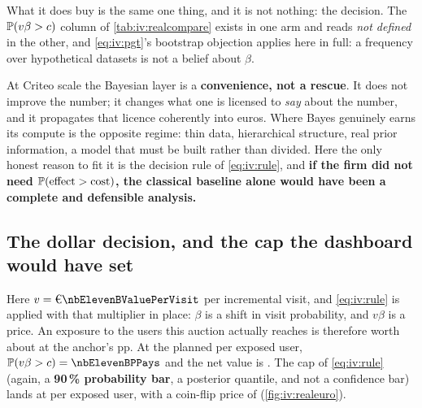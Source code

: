 What it does buy is the same one thing, and it is not nothing: the decision. The
$\operatorname{\mathbb{P}}(v\beta > c)$ column of \cref{tab:iv:realcompare} exists in one arm and reads \emph{not
defined} in the other, and \cref{eq:iv:pgt}'s bootstrap objection applies here in full: a
frequency over hypothetical datasets is not a belief about $\beta$.

\begin{remark}
At Criteo scale the Bayesian layer is a \textbf{convenience, not a rescue}. It does not improve the
number; it changes what one is licensed to \emph{say} about the number, and it propagates that
licence coherently into euros. Where Bayes genuinely earns its compute is the opposite regime:
thin data, hierarchical structure, real prior information, a model that must be built rather than
divided. Here the only honest reason to fit it is the decision rule of \cref{eq:iv:rule}, and
\textbf{if the firm did not need $\operatorname{\mathbb{P}}(\text{effect} > \text{cost})$, the classical baseline alone
would have been a complete and defensible analysis.}
\end{remark}

\subsection*{The dollar decision, and the cap the dashboard would have set}

Here $v = \eur{\nbElevenBValuePerVisit}$ per incremental visit, and \cref{eq:iv:rule} is applied with
that multiplier in place: $\beta$ is a shift in visit probability, and $v\beta$ is a price. An
exposure to the users this auction actually reaches is therefore worth about
\eur{\nbElevenBAnchorCap} at the anchor's \nbElevenBAnchorWald{} pp. At the planned
\eur{\nbElevenBCost} per exposed user, $\Prob(v\beta > c) = \nbElevenBPPays$ and the net value is
\eur{\nbElevenBNet}. The cap of \cref{eq:iv:rule} (again, a \textbf{90\,\% probability bar}, a
posterior quantile, and not a confidence bar) lands at \eur{\nbElevenBCap} per exposed user, with
a coin-flip price of \eur{\nbElevenBCoinflip} (\cref{fig:iv:realeuro}).



